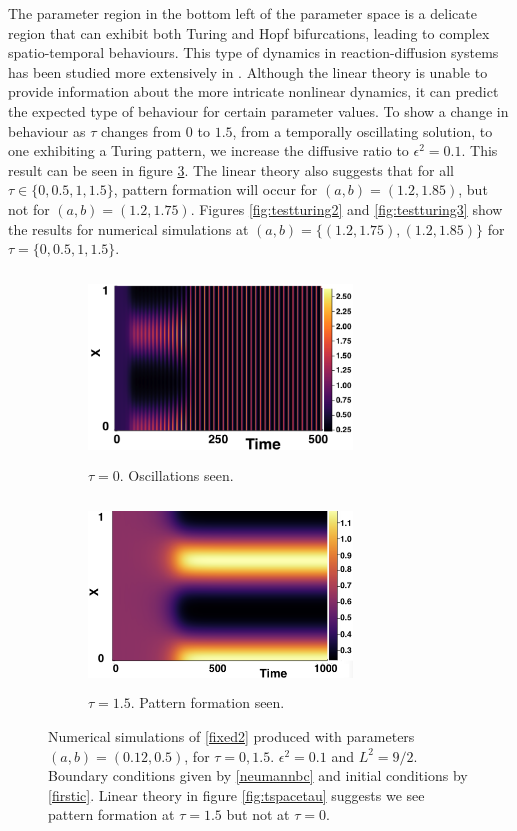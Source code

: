The parameter region in the bottom left of the parameter space is a delicate region that can exhibit both Turing and Hopf bifurcations, leading to complex spatio-temporal behaviours. This type of dynamics in reaction-diffusion systems has been studied more extensively in \cite{krausefixed,jiang}. Although the linear theory is unable to provide information about the more intricate nonlinear dynamics, it can predict the expected type of behaviour for certain parameter values. To show a change in behaviour as $\tau$ changes from $0$ to $1.5$, from a temporally oscillating solution, to one exhibiting a Turing pattern, we increase the diffusive ratio to $\epsilon^2=0.1$. This result can be seen in figure \ref{fig:testturing}. The linear theory also suggests that for all $\tau\in\{0,0.5,1,1.5\}$, pattern formation will occur for $(a,b)=(1.2,1.85)$, but not for $(a,b)=(1.2,1.75)$. Figures \ref{fig:testturing2} and \ref{fig:testturing3} show the results for numerical simulations at $(a,b)=\{(1.2,1.75),(1.2,1.85)\}$ for $\tau=\{0,0.5,1,1.5\}$.
\begin{figure}[h]
    \centering
    \begin{subfigure}[b]{0.45\textwidth}
        \centering
        \includegraphics[width=7cm,height=5cm]{toscill.png}
        \caption{$\tau=0$. Oscillations seen.}
        \label{}
    \end{subfigure}
    \hfill
    \begin{subfigure}[b]{0.45\textwidth}
        \centering
        \includegraphics[width=7cm,height=5cm]{tpattpred.png}
        \caption{$\tau=1.5$. Pattern formation seen.}
        \label{}
    \end{subfigure}
    \caption{Numerical simulations of \eqref{fixed2} produced with parameters $(a,b)=(0.12,0.5)$, for $\tau=0,1.5$. $\epsilon^2=0.1$ and $L^2=9/2$. Boundary conditions given by \eqref{neumannbc} and initial conditions by \eqref{firstic}. Linear theory in figure \ref{fig:tspacetau} suggests we see pattern formation at $\tau=1.5$ but not at $\tau=0$.}
    \label{fig:testturing}
\end{figure}


